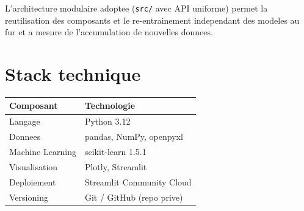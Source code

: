\documentclass[12pt,a4paper]{article}
\begin{document}
L'architecture modulaire adoptee (\texttt{src/} avec API uniforme) permet la reutilisation des composants et le re-entrainement independant des modeles au fur et a mesure de l'accumulation de nouvelles donnees.

\section*{Stack technique}

\begin{table}[H]
\centering
\begin{tabular}{ll}
\toprule
\textbf{Composant} & \textbf{Technologie} \\
\midrule
Langage & Python 3.12 \\
Donnees & pandas, NumPy, openpyxl \\
Machine Learning & scikit-learn 1.5.1 \\
Visualisation & Plotly, Streamlit \\
Deploiement & Streamlit Community Cloud \\
Versioning & Git / GitHub (repo prive) \\
\bottomrule
\end{tabular}
\end{table}
\end{document}
